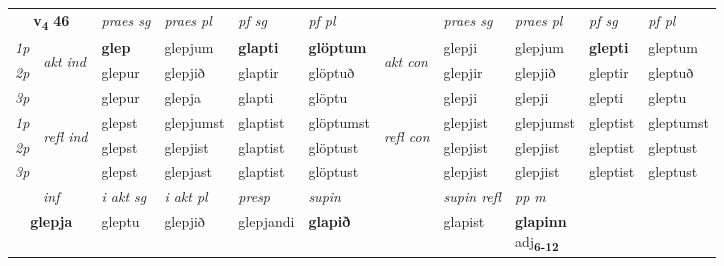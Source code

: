 \noindent
\begin{tabular}{lllllllllll} \toprule
\multicolumn{2}{c}{\textbf{v{\textsubscript{4}}} \Large{\textbf{46}}}  &  \textit{praes sg}  & \textit{praes pl}  &\textit{ pf sg} & \textit{pf pl} &  &  \textit{praes sg}  & \textit{praes pl}  & \textit{pf sg} & \textit{pf pl } \\*
	\cmidrule{3-6} \cmidrule{8-11}
 {\textit{1p}} & \multirow{3}{*}{\begin{turn}{90}\textit{akt ind}\end{turn}} & \textbf{glep} & glepjum & \textbf{glapti} & \textbf{glöptum} & \multirow{3}{*}{\begin{turn}{90}\textit{akt con}\end{turn}} &glepji & glepjum & \textbf{glepti} & gleptum\\*
 {\textit{2p}} &  &  glepur  & glepjið & glaptir & glöptuð & & glepjir & glepjið & gleptir & gleptuð \\*
{\textit{3p}} &  & glepur & glepja & glapti & glöptu & & glepji & glepji& glepti & gleptu \\*
\cmidrule{3-6} \cmidrule{8-11}
 {\textit{1p}} & \multirow{3}{*}{\begin{turn}{90}\textit{refl ind}\end{turn}}  & glepst & glepjumst & glaptist & glöptumst & \multirow{3}{*}{\begin{turn}{90}\textit{refl con}\end{turn}}  &glepjist & glepjumst & gleptist & gleptumst \\*
 {\textit{2p}} &  & glepst & glepjist & glaptist & glöptust & &glepjist & glepjist & gleptist & gleptust \\*
 {\textit{3p}}  & & glepst & glepjast & glaptist & glöptust & & glepjist & glepjist& gleptist & gleptust \\*
\cmidrule{3-6} \cmidrule{8-11}

   \multicolumn{2}{c}{\textit{inf}}  & \textit{i akt sg} & \textit{i akt pl}   & \textit{presp} & \textit{supin} && \textit{supin refl} & \textit{pp m} \\*
  \multicolumn{2}{c}{\textbf{glepja}} & gleptu  & glepjið   & glepjandi &  \textbf{glapið} && glapist & \specialcell{\textbf{glapinn} \\ adj\textbf{\textsubscript{6-12}}} \\*
\end{tabular}

